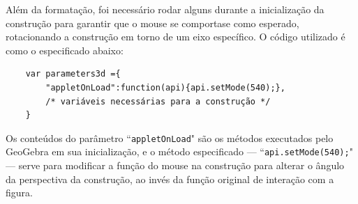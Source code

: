 Além da formatação, foi necessário rodar alguns durante a inicialização da construção para garantir que o mouse se comportase como esperado, rotacionando a construção em torno de um eixo específico. O código utilizado é como o especificado abaixo:
\\

\begin{verbatim}
    var parameters3d ={
        "appletOnLoad":function(api){api.setMode(540);},
        /* variáveis necessárias para a construção */
    }
\end{verbatim}


Os conteúdos do parâmetro ``\texttt{appletOnLoad}" são os métodos executados pelo GeoGebra em sua inicialização, e o método especificado --- ``\texttt{api.setMode(540);}" --- serve para modificar a função do mouse na construção para alterar o ângulo da perspectiva da construção, ao invés da função original de interação com a figura.

